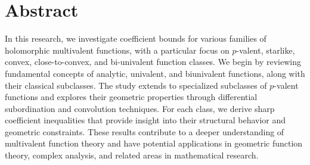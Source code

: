 \chapter*{Abstract}
	In this research, we investigate coefficient bounds for various families of holomorphic multivalent functions, with a particular focus on $p$-valent, starlike, convex, close-to-convex, and bi-univalent function classes. We begin by reviewing fundamental concepts of analytic, univalent, and biunivalent functions, along with their classical subclasses. The study extends to specialized subclasses of $p$-valent functions and explores their geometric properties through differential subordination and convolution techniques. For each class, we derive sharp coefficient inequalities that provide insight into their structural behavior and geometric constraints. These results contribute to a deeper understanding of multivalent function theory and have potential applications in geometric function theory, complex analysis, and related areas in mathematical research.
